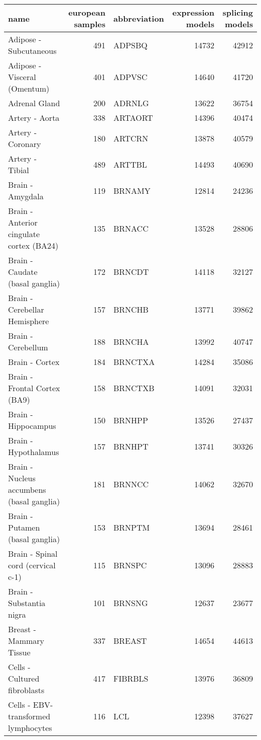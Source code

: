 \begin{table}[ht]
\centering
\begin{tabular}{lrlrr}
  \hline
name & european samples & abbreviation & expression models & splicing models \\ 
  \hline
Adipose - Subcutaneous & 491 & ADPSBQ & 14732 & 42912 \\ 
  Adipose - Visceral (Omentum) & 401 & ADPVSC & 14640 & 41720 \\ 
  Adrenal Gland & 200 & ADRNLG & 13622 & 36754 \\ 
  Artery - Aorta & 338 & ARTAORT & 14396 & 40474 \\ 
  Artery - Coronary & 180 & ARTCRN & 13878 & 40579 \\ 
  Artery - Tibial & 489 & ARTTBL & 14493 & 40690 \\ 
  Brain - Amygdala & 119 & BRNAMY & 12814 & 24236 \\ 
  Brain - Anterior cingulate cortex (BA24) & 135 & BRNACC & 13528 & 28806 \\ 
  Brain - Caudate (basal ganglia) & 172 & BRNCDT & 14118 & 32127 \\ 
  Brain - Cerebellar Hemisphere & 157 & BRNCHB & 13771 & 39862 \\ 
  Brain - Cerebellum & 188 & BRNCHA & 13992 & 40747 \\ 
  Brain - Cortex & 184 & BRNCTXA & 14284 & 35086 \\ 
  Brain - Frontal Cortex (BA9) & 158 & BRNCTXB & 14091 & 32031 \\ 
  Brain - Hippocampus & 150 & BRNHPP & 13526 & 27437 \\ 
  Brain - Hypothalamus & 157 & BRNHPT & 13741 & 30326 \\ 
  Brain - Nucleus accumbens (basal ganglia) & 181 & BRNNCC & 14062 & 32670 \\ 
  Brain - Putamen (basal ganglia) & 153 & BRNPTM & 13694 & 28461 \\ 
  Brain - Spinal cord (cervical c-1) & 115 & BRNSPC & 13096 & 28883 \\ 
  Brain - Substantia nigra & 101 & BRNSNG & 12637 & 23677 \\ 
  Breast - Mammary Tissue & 337 & BREAST & 14654 & 44613 \\ 
  Cells - Cultured fibroblasts & 417 & FIBRBLS & 13976 & 36809 \\ 
  Cells - EBV-transformed lymphocytes & 116 & LCL & 12398 & 37627 \\ 

\end{tabular}
\end{table}
